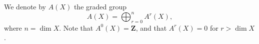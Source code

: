 We denote by $A(X)$ the graded group
$$A(X) = \bigoplus_{r=0}^{n} A^r(X),$$
where $n = \dim X$. Note that $A^0(X) = \mathbf{Z}$, and that $A^r(X) = 0$ for $r > \dim X$.
